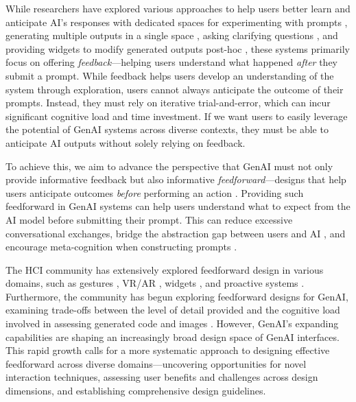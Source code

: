 While researchers have explored various approaches to help users better learn and anticipate AI's responses with dedicated spaces for experimenting with prompts \cite{arawjo2024chainforge, angert2023spellburst}, generating multiple outputs in a single space \cite{luminate, gero2024llmsensemakingscale}, asking clarifying questions \cite{deepresearch2025}, and providing widgets to modify generated outputs post-hoc \cite{priyan2024dynavis, masson2024directGPT, graphologue}, these systems primarily focus on offering \textit{feedback}—helping users understand what happened \textit{after} they submit a prompt.
While feedback helps users develop an understanding of the system through exploration, users cannot always anticipate the outcome of their prompts.
Instead, they must rely on iterative trial-and-error, which can incur significant cognitive load and time investment.
If we want users to easily leverage the potential of GenAI systems across diverse contexts, they must be able to anticipate AI outputs without solely relying on feedback.

To achieve this, we aim to advance the perspective that GenAI must not only provide informative feedback but also informative \textit{feedforward}---designs that help users anticipate outcomes \textit{before} performing an action \cite{vermeulen2013feedforward}.
Providing such feedforward in GenAI systems can help users understand what to expect from the AI model before submitting their prompt.
This can reduce excessive conversational exchanges, bridge the abstraction gap between users and AI \cite{liu2023groundedabstraction, hari2024gulfenvisioning, priyan2024imaginingafuture}, and encourage meta-cognition when constructing prompts \cite{tankelevitch2024metacogAI}.

The HCI community has extensively explored feedforward design in various domains, such as gestures \cite{bau2008octopocus}, VR/AR \cite{muresan2023feedforwardVR}, widgets \cite{coppers2019fortunettes, terry2002sideviews}, and proactive systems \cite{allen1999mixedinitiative}.
Furthermore, the community has begun exploring feedforward designs for GenAI, examining trade-offs between the level of detail provided and the cognitive load involved in assessing generated code and images \cite{zhutian2024sketchgenerate, dang2022ganslider}.
However, GenAI's expanding capabilities are shaping an increasingly broad design space of GenAI interfaces.
This rapid growth calls for a more systematic approach to designing effective feedforward across diverse domains---uncovering opportunities for novel interaction techniques, assessing user benefits and challenges across design dimensions, and establishing comprehensive design guidelines.

